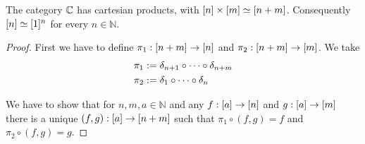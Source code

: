 \documentclass{article}
\begin{document}
\begin{thm}
The category $\mathbb{C}$ has cartesian products, with $[n]\times[m]\simeq
[n+m]$. Consequently $[n]\simeq[1]^n$ for every $n\in\mathbb{N}$.
\end{thm}

\begin{proof}
First we have to define $\pi_1:[n+m]\to[n]$ and $\pi_2:[n+m]\to[m]$.
We take
\begin{align*}
\pi_1 & := \delta_{n+1}\circ\cdots\circ\delta_{n+m}\\
\pi_2 & := \delta_{1}\circ\cdots\circ\delta_{n}
\end{align*}

We have to show that for $n,m,a\in\mathbb{N}$ and any $f:[a]\to[n]$
and $g:[a]\to[m]$ there is a unique $(f,g):[a]\to[n+m]$
such that $\pi_1\circ(f,g)=f$ and $\pi_2\circ(f,g)=g$. 
\end{proof}
\end{document}
